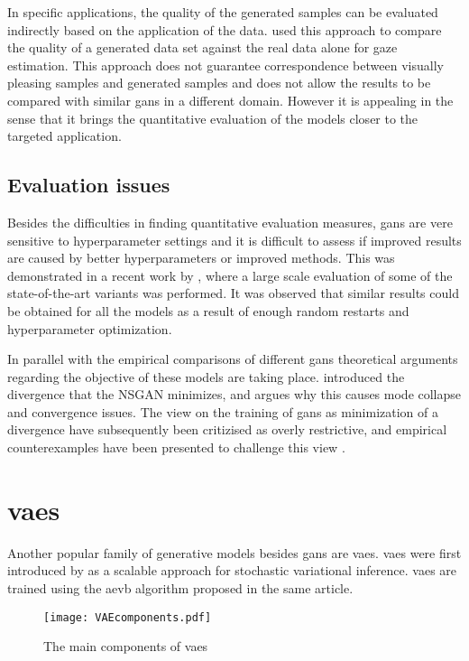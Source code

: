 In specific applications, the quality of the generated samples can be evaluated indirectly based on the application of the data. \textcite{shrivastava2016learning} used this approach to compare the quality of a generated data set against the real data alone for gaze estimation. This approach does not guarantee correspondence between visually pleasing samples and generated samples and does not allow the results to be compared with similar \acrshort{gans} in a different domain. However it is appealing in the sense that it brings the quantitative evaluation of the models closer to the targeted application. 

\subsection{Evaluation issues}
Besides the difficulties in finding quantitative evaluation measures, \acrshort{gans} are vere sensitive to hyperparameter settings and it is difficult to assess if improved results are caused by better hyperparameters or improved methods. This was demonstrated in a recent work by \textcite{lucic2017gans}, where a large scale evaluation of some of the state-of-the-art variants was performed. It was observed that similar results could be obtained for all the models as a result of enough random restarts and hyperparameter optimization.

In parallel with the empirical comparisons of different \acrshort{gans} theoretical arguments regarding the objective of these models are taking place. \textcite{arjovsky2017towards} introduced the divergence that the NSGAN minimizes, and argues why this causes mode collapse and convergence issues. The view on the training of \acrshort{gans} as minimization of a divergence have subsequently been critizised as overly restrictive, and empirical counterexamples have been presented to challenge this view \textcite{fedus2017many}.


\section{\acrlong{vaes}}
Another popular family of generative models besides \acrshort{gans} are \acrfull{vaes}. \acrlong{vaes} were first introduced by \textcite{kingma2013auto} as a scalable approach for stochastic variational inference. \acrshort{vaes} are trained using the \acrfull{aevb} algorithm proposed in the same article. 

\begin{figure}[t]
    \centering
    \texttt{[image: VAEcomponents.pdf]}
    \caption{The main components of \acrshort{vaes}}
    \label{fig:VAE}
\end{figure}

